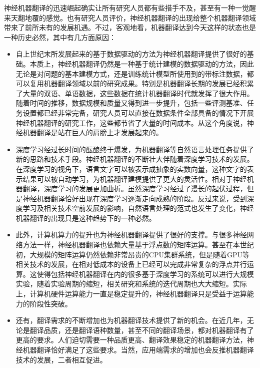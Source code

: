 \parinterval 神经机器翻译的迅速崛起确实让所有研究人员都有些措手不及，甚至有一种一觉醒来天翻地覆的感觉。也有研究人员评价，神经机器翻译的出现给整个机器翻译领域带来了前所未有的发展机遇。不过，客观地看，机器翻译达到今天这样的状态也是一种历史必然，其中有几方面原因：

\begin{itemize}
\vspace{0.3em}
\item 自上世纪末所发展起来的基于数据驱动的方法为神经机器翻译提供了很好的基础。本质上，神经机器翻译仍然是一种基于统计建模的数据驱动的方法，因此无论是对问题的基本建模方式，还是训练统计模型所使用到的带标注数据，都可以复用机器翻译领域以前的研究成果。特别是机器翻译长期的发展已经积累了大量的双语、单语数据，这些数据在统计机器翻译时代就发挥了很大作用。随着时间的推移，数据规模和质量又得到进一步提升，包括一些评测基准、任务设置都已经非常完备，研究人员可以直接在数据条件全部具备的情况下开展神经机器翻译的研究工作，这些都节省了大量的时间成本。从这个角度说，神经机器翻译是站在巨人的肩膀上才发展起来的。
\vspace{0.3em}
\item 深度学习经过长时间的酝酿终于爆发，为机器翻译等自然语言处理任务提供了新的思路和技术手段。神经机器翻译的不断壮大伴随着深度学习技术的发展。在深度学习的视角下，语言文字可以被表示成抽象的实数向量，这种文字的表示结果可以被自动学习，为机器翻译建模提供了更大的灵活性。相对于神经机器翻译，深度学习的发展更加曲折。虽然深度学习经过了漫长的起伏过程，但是神经机器翻译恰好出现在深度学习逐渐走向成熟的阶段。反过来说，受到深度学习及相关技术空前发展的影响，自然语言处理的范式也发生了变化，神经机器翻译的出现只是这种趋势下的一种必然。
\vspace{0.3em}
\item 此外，计算机算力的提升也为神经机器翻译提供了很好的支撑。与很多神经网络方法一样，神经机器翻译也依赖大量基于浮点数的矩阵运算。甚至在本世纪初，大规模的矩阵运算仍然依赖非常昂贵的CPU集群系统，但是随着GPU等相关技术的发展，在相对低成本的设备上已经可以完成非常复杂的浮点并行运算。这使得包括神经机器翻译在内的很多基于深度学习的系统可以进行大规模实验，随着实验周期的缩短，相关研究和系统的迭代周期也大大缩短。实际上，计算机硬件运算能力一直是稳定提升的，神经机器翻译只是受益于运算能力的阶段性突破。
\vspace{0.3em}
\item 还有，翻译需求的不断增加也为机器翻译技术提供了新的机会。在近几年，无论是翻译品质，还是翻译语种数量，甚至不同的翻译场景，都对机器翻译有了更高的要求。人们迫切需要一种品质更高、翻译效果稳定的机器翻译方法，神经机器翻译恰好满足了这些要求。当然，应用端需求的增加也会反推机器翻译技术的发展，二者相互促进。
\vspace{0.3em}
\end{itemize}

